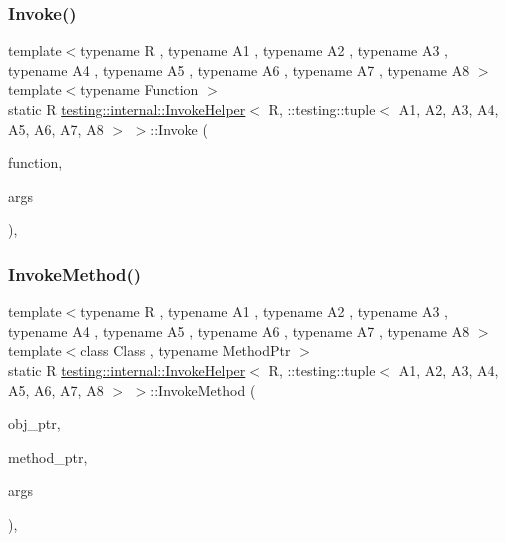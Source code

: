 \subsubsection{\texorpdfstring{Invoke()}{Invoke()}}
{\footnotesize\ttfamily template$<$typename R , typename A1 , typename A2 , typename A3 , typename A4 , typename A5 , typename A6 , typename A7 , typename A8 $>$ \\
template$<$typename Function $>$ \\
static R \mbox{\hyperlink{classtesting_1_1internal_1_1InvokeHelper}{testing\+::internal\+::\+Invoke\+Helper}}$<$ R, \+::testing\+::tuple$<$ A1, A2, A3, A4, A5, A6, A7, A8 $>$ $>$\+::Invoke (\begin{DoxyParamCaption}\item[{\mbox{\hyperlink{structtesting_1_1internal_1_1Function}{Function}}}]{function,  }\item[{const \+::testing\+::tuple$<$ A1, A2, A3, A4, A5, A6, A7, A8 $>$ \&}]{args }\end{DoxyParamCaption})\hspace{0.3cm}{\ttfamily [inline]}, {\ttfamily [static]}}

\mbox{\label{classtesting_1_1internal_1_1InvokeHelper_3_01R_00_01_1_1testing_1_1tuple_3_01A1_00_01A2_00_01A3_3417e5c524ad74e18b0b4b31a005e438_ae6d436cea8db7cfa36330728d3e5da9a}} 
\subsubsection{\texorpdfstring{InvokeMethod()}{InvokeMethod()}}
{\footnotesize\ttfamily template$<$typename R , typename A1 , typename A2 , typename A3 , typename A4 , typename A5 , typename A6 , typename A7 , typename A8 $>$ \\
template$<$class Class , typename Method\+Ptr $>$ \\
static R \mbox{\hyperlink{classtesting_1_1internal_1_1InvokeHelper}{testing\+::internal\+::\+Invoke\+Helper}}$<$ R, \+::testing\+::tuple$<$ A1, A2, A3, A4, A5, A6, A7, A8 $>$ $>$\+::Invoke\+Method (\begin{DoxyParamCaption}\item[{Class $\ast$}]{obj\+\_\+ptr,  }\item[{Method\+Ptr}]{method\+\_\+ptr,  }\item[{const \+::testing\+::tuple$<$ A1, A2, A3, A4, A5, A6, A7, A8 $>$ \&}]{args }\end{DoxyParamCaption})\hspace{0.3cm}{\ttfamily [inline]}, {\ttfamily [static]}}



